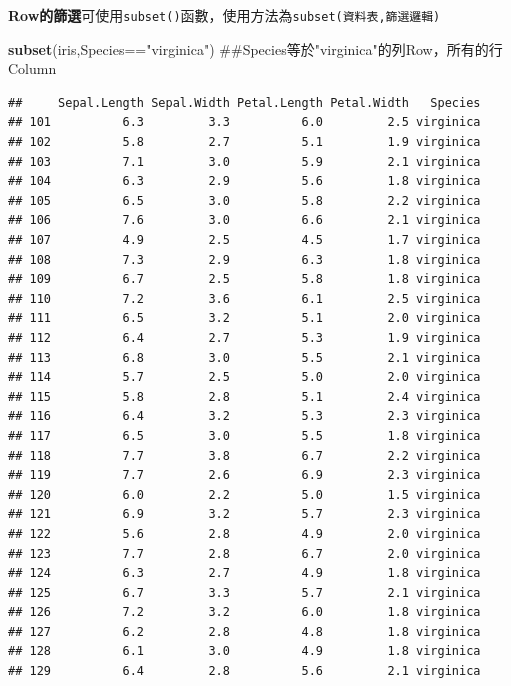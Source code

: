 \documentclass[]{book}
\newenvironment{Shaded}{\begin{snugshade}}{\end{snugshade}}
\newcommand{\KeywordTok}[1]{\textcolor[rgb]{0.13,0.29,0.53}{\textbf{{#1}}}}
\newcommand{\StringTok}[1]{\textcolor[rgb]{0.31,0.60,0.02}{{#1}}}
\newcommand{\NormalTok}[1]{{#1}}
\theoremstyle{definition}
\theoremstyle{definition}
\theoremstyle{remark}
\begin{document}
\textbf{Row的篩選}可使用\texttt{subset()}函數，使用方法為\texttt{subset(資料表,篩選邏輯)}

\begin{Shaded}
\begin{Highlighting}[]
\KeywordTok{subset}\NormalTok{(iris,Species==}\StringTok{"virginica"}\NormalTok{) ##Species等於"virginica"的列Row，所有的行Column}
\end{Highlighting}
\end{Shaded}

\begin{verbatim}
##     Sepal.Length Sepal.Width Petal.Length Petal.Width   Species
## 101          6.3         3.3          6.0         2.5 virginica
## 102          5.8         2.7          5.1         1.9 virginica
## 103          7.1         3.0          5.9         2.1 virginica
## 104          6.3         2.9          5.6         1.8 virginica
## 105          6.5         3.0          5.8         2.2 virginica
## 106          7.6         3.0          6.6         2.1 virginica
## 107          4.9         2.5          4.5         1.7 virginica
## 108          7.3         2.9          6.3         1.8 virginica
## 109          6.7         2.5          5.8         1.8 virginica
## 110          7.2         3.6          6.1         2.5 virginica
## 111          6.5         3.2          5.1         2.0 virginica
## 112          6.4         2.7          5.3         1.9 virginica
## 113          6.8         3.0          5.5         2.1 virginica
## 114          5.7         2.5          5.0         2.0 virginica
## 115          5.8         2.8          5.1         2.4 virginica
## 116          6.4         3.2          5.3         2.3 virginica
## 117          6.5         3.0          5.5         1.8 virginica
## 118          7.7         3.8          6.7         2.2 virginica
## 119          7.7         2.6          6.9         2.3 virginica
## 120          6.0         2.2          5.0         1.5 virginica
## 121          6.9         3.2          5.7         2.3 virginica
## 122          5.6         2.8          4.9         2.0 virginica
## 123          7.7         2.8          6.7         2.0 virginica
## 124          6.3         2.7          4.9         1.8 virginica
## 125          6.7         3.3          5.7         2.1 virginica
## 126          7.2         3.2          6.0         1.8 virginica
## 127          6.2         2.8          4.8         1.8 virginica
## 128          6.1         3.0          4.9         1.8 virginica
## 129          6.4         2.8          5.6         2.1 virginica

\end{verbatim}
\end{document}

